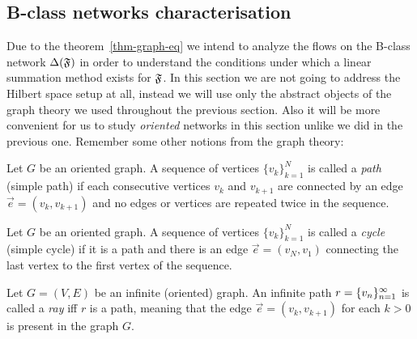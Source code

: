 \documentclass[12pt]{article}
\begin{document}
  \subsection{B-class networks characterisation}
    Due to the theorem~\ref{thm-graph-eq} we intend to analyze the flows on the B-class network
      $\Delta(\mathfrak{F})$ in order to understand the conditions under which a linear
      summation method exists for $\mathfrak{F}$.
    In this section we are not going to address the Hilbert space setup at all,
      instead we will use only the abstract objects of the graph theory
      we used throughout the previous section.
    Also it will be more convenient for us to study \emph{oriented} networks in this section unlike we
      did in the previous one.
    Remember some other notions from the graph theory:
    \begin{definition}
      Let $G$ be an oriented graph.
      A sequence of vertices $\{v_k\}_{k=1}^N$ is called a \emph{path} (simple path) if each consecutive vertices
        $v_k$ and $v_{k+1}$ are connected by an edge $\vec{e} = (v_k, v_{k+1})$ and no edges or vertices are repeated twice in the sequence.
    \end{definition}
    \begin{definition}
      Let $G$ be an oriented graph.
      A sequence of vertices $\{v_k\}_{k=1}^N$ is called a \emph{cycle} (simple cycle) if it is
        a path and there is an edge $\vec{e} = (v_N, v_1)$ connecting the last vertex to the first vertex of the sequence.
    \end{definition}
    \begin{definition}
      Let $G = (V, E)$ be an infinite (oriented) graph.
      An infinite path $r = \{{v}_n\}_{n=1}^\infty$ is called a \emph{ray} iff
      $r$ is a path, meaning that the edge $\vec{e} = (v_k, v_{k+1})$ for each $k > 0$ is present in the graph $G$.
    \end{definition}
\end{document}
